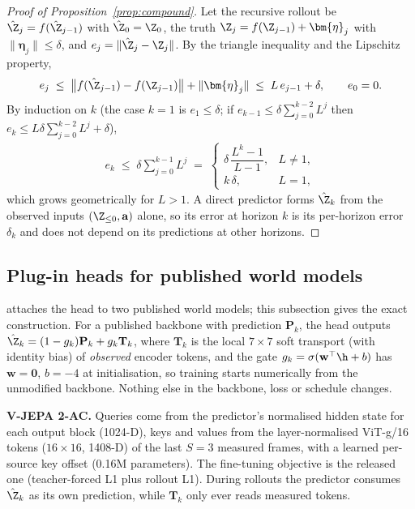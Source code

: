 \begin{proof}[Proof of Proposition~\ref{prop:compound}]
Let the recursive rollout be $\hat{\Z}_j=f(\hat{\Z}_{j-1})$ with $\hat{\Z}_0=\Z_0$, the truth
$\Z_j=f(\Z_{j-1})+\bm{\eta}_j$ with $\|\bm{\eta}_j\|\le\delta$, and $e_j=\|\hat{\Z}_j-\Z_j\|$. By the triangle inequality
and the Lipschitz property,
\begin{align}
e_j\;\le\;\big\|f(\hat{\Z}_{j-1})-f(\Z_{j-1})\big\|+\|\bm{\eta}_j\|\;\le\;L\,e_{j-1}+\delta,\qquad e_0=0 .
\end{align}
By induction on $k$ (the case $k=1$ is $e_1\le\delta$; if $e_{k-1}\le\delta\sum_{j=0}^{k-2}L^j$ then
$e_k\le L\delta\sum_{j=0}^{k-2}L^j+\delta$),
\begin{align}
e_k\;\le\;\delta\sum_{j=0}^{k-1}L^j\;=\;
\begin{cases}\delta\,\dfrac{L^k-1}{L-1}, & L\neq 1,\\[4pt] k\,\delta, & L=1,\end{cases}
\end{align}
which grows geometrically for $L>1$. A direct predictor forms $\hat{\Z}_k$ from the observed inputs
$(\Z_{\le 0},\mathbf{a})$ alone, so its error at horizon $k$ is its per-horizon error $\delta_k$ and does not depend on
its predictions at other horizons.
\end{proof}

\FloatBarrier
\subsection{Plug-in heads for published world models}\label{app:plugin}
 attaches the head to two published world models; this subsection gives the exact construction.
For a published backbone with prediction $\mathbf{P}_k$, the head outputs $\hat\Z_k=(1-g_k)\mathbf{P}_k+g_k\mathbf{T}_k$,
where $\mathbf{T}_k$ is the local $7{\times}7$ soft transport (with identity bias) of \emph{observed} encoder tokens, and
the gate $g_k=\sigma(\mathbf{w}^\top\h+b)$ has $\mathbf{w}=\mathbf{0}$, $b=-4$ at initialisation, so training starts
numerically from the unmodified backbone. Nothing else in the backbone, loss or schedule changes.

\textbf{V-JEPA 2-AC.} Queries come from the predictor's normalised hidden state for each output block (1024-D), keys and
values from the layer-normalised ViT-g/16 tokens ($16{\times}16$, 1408-D) of the last $S{=}3$ measured frames, with a
learned per-source key offset (0.16M parameters). The fine-tuning objective is the released one (teacher-forced L1 plus
rollout L1). During rollouts the predictor consumes $\hat\Z_k$ as its own prediction, while $\mathbf{T}_k$ only ever
reads measured tokens.

